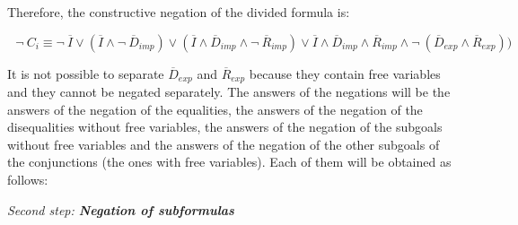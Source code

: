 \documentclass{tlp}
\begin{document}
Therefore, the constructive negation of the divided formula is:


\noindent
$ ~~~\neg~C_i \equiv \neg~\overline{I} \vee (\overline{I} \wedge
\neg~\overline{D}_{imp}) \vee (\overline{I} \wedge \overline{D}_{imp}
\wedge \neg~\overline{R}_{imp}) \vee \overline{I} \wedge
\overline{D}_{imp} \wedge \overline{R}_{imp} \wedge
\neg~(\overline{D}_{exp} \wedge \overline{R}_{exp})) $
\noindent

It is not possible to separate $\overline{D}_{exp}$ and
$\overline{R}_{exp}$ because they contain free variables and
they cannot be negated separately. The answers of the negations
will be the answers of the negation of the equalities, the answers of
the negation of the disequalities without free variables, the answers
of the negation of the subgoals without free variables and the answers
of the negation of the other subgoals of the conjunctions (the ones
with free variables). Each of them will be obtained as follows:
\medskip

\noindent
{\em Second step: {\bf Negation of subformulas}}
\end{document}
